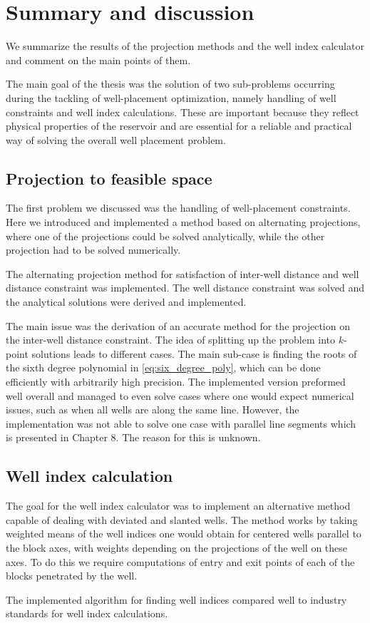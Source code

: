 \chapter{Summary and discussion}
%
We summarize the results of the projection methods
and the well index calculator and comment on the
main points of them. 

The main goal of the thesis was the solution of two sub-problems 
occurring during the tackling of well-placement optimization, namely 
handling of well constraints and well index calculations. These
are important because they reflect physical properties of the 
reservoir and are essential for a reliable and practical way
of solving the overall well placement problem. 
%
\section{Projection to feasible space}
%
The first problem we discussed was the handling of 
well-placement constraints. Here we introduced and 
implemented a method based on alternating projections, 
where one of the projections could be solved analytically, 
while the other projection had to be solved numerically.

The alternating projection method for satisfaction
of inter-well distance and well distance constraint
was implemented. The well distance constraint was
solved and the analytical solutions were derived
and implemented. 

The main issue was the derivation
of an accurate method for the projection on the 
inter-well distance constraint. The idea of splitting
up the problem into $k$-point solutions leads to
different cases. The main sub-case is finding the
roots of the sixth degree polynomial in \eqref{eq:six_degree_poly},
which can be done efficiently with arbitrarily high
precision. The implemented version preformed well
overall and managed to even solve cases where one
would expect numerical issues, such as when
all wells are along the same line. However, the 
implementation was not able to solve one case 
with parallel line segments which is presented 
in Chapter 8. The reason for this is unknown.
%
\section{Well index calculation}
%
The goal for the well index calculator was to
implement an alternative method capable of 
dealing with deviated and slanted wells.
The method works by taking weighted means of the well 
indices one would obtain for centered wells parallel to 
the block axes, with weights depending on the projections 
of the well on these axes. To do this we require  
computations of entry and exit points of each of the
blocks penetrated by the well.

The implemented algorithm for finding well
indices compared well to industry standards
for well index calculations.
%
